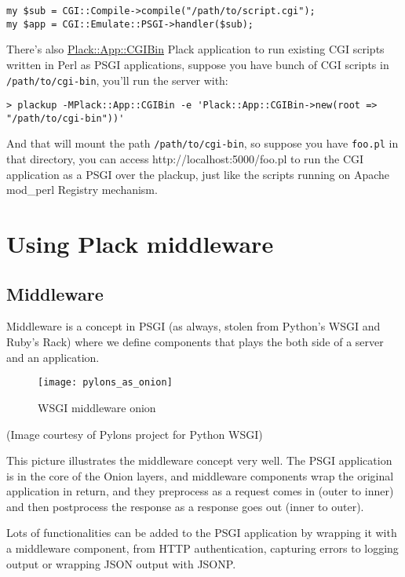 \begin{lstlisting}
my $sub = CGI::Compile->compile("/path/to/script.cgi");
my $app = CGI::Emulate::PSGI->handler($sub);
\end{lstlisting}

There's also
\href{http://search.cpan.org/perldoc?Plack::App::CGIBin}{Plack::App::CGIBin}
Plack application to run existing CGI scripts written in Perl as PSGI
applications, suppose you have bunch of CGI scripts in
\lstinline!/path/to/cgi-bin!, you'll run the server with:

\begin{lstlisting}
> plackup -MPlack::App::CGIBin -e 'Plack::App::CGIBin->new(root => "/path/to/cgi-bin"))'
\end{lstlisting}

And that will mount the path \lstinline!/path/to/cgi-bin!, so suppose
you have \lstinline!foo.pl! in that directory, you can access
http://localhost:5000/foo.pl to run the CGI application as a PSGI over
the plackup, just like the scripts running on Apache mod\_perl Registry
mechanism.

\chapter{Using Plack
middleware}\label{day-10-using-plack-middleware}

\section{Middleware}\label{middleware}

Middleware is a concept in PSGI (as always, stolen from Python's WSGI
and Ruby's Rack) where we define components that plays the both side of
a server and an application.

\begin{figure}[htbp]
\centering
\texttt{[image: pylons\_as\_onion]}
\caption{WSGI middleware onion}
\end{figure}

(Image courtesy of Pylons project for Python WSGI)

This picture illustrates the middleware concept very well. The PSGI
application is in the core of the Onion layers, and middleware
components wrap the original application in return, and they preprocess
as a request comes in (outer to inner) and then postprocess the response
as a response goes out (inner to outer).

Lots of functionalities can be added to the PSGI application by wrapping
it with a middleware component, from HTTP authentication, capturing
errors to logging output or wrapping JSON output with JSONP.

